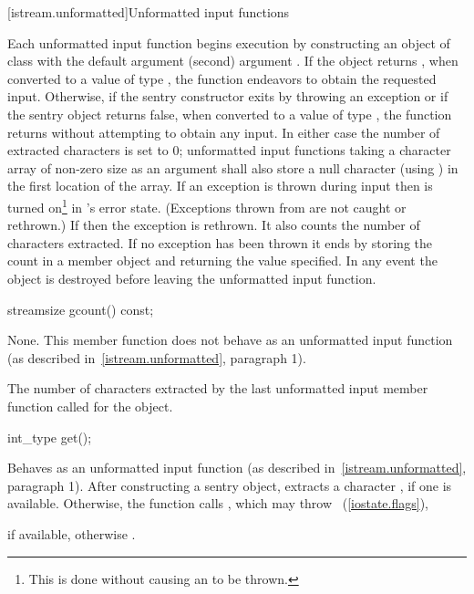 [istream.unformatted]{Unformatted input functions}

\pnum
Each unformatted input function begins execution by constructing an object of class
with the default argument
(second) argument
.
If the
object returns
,
when converted to a value of type
,
the function endeavors
to obtain the requested input.
Otherwise, if the sentry constructor exits by throwing an exception or if
the sentry object returns false, when converted to a value of type
,
the function returns without attempting to obtain any input.
In either case the number of extracted characters is set to 0;
unformatted input functions taking a character array of non-zero size as
an argument shall also store a null character (using
)
in the first location of the array.
If an exception is thrown during input then
is turned on\footnote{This is done without causing an
to be thrown.}
in
's
error state.
(Exceptions thrown from
are not caught or rethrown.)
If
then the exception is rethrown.
It also counts the number of characters extracted.
If no exception has been thrown it ends
by storing the count in a member object
and returning the value specified.
In any event the
object
is destroyed before leaving the unformatted input function.

%
\begin{itemdecl}
streamsize gcount() const;
\end{itemdecl}

\begin{itemdescr}
\pnum
\effects
None.
This member function does not behave as an unformatted
input function (as described in~\ref{istream.unformatted}, paragraph 1).

\pnum
\returns
The number of characters
extracted by the last unformatted input member function called for the object.
\end{itemdescr}

%
\begin{itemdecl}
int_type get();
\end{itemdecl}

\begin{itemdescr}
\pnum
\effects
Behaves as an unformatted input function
(as described in~\ref{istream.unformatted}, paragraph 1).
After constructing a sentry object, extracts
a character , if one is available.
Otherwise, the function calls
,
which may throw
~(\ref{iostate.flags}),

\pnum
\returns
{} if available,
otherwise
.
\end{itemdescr}

